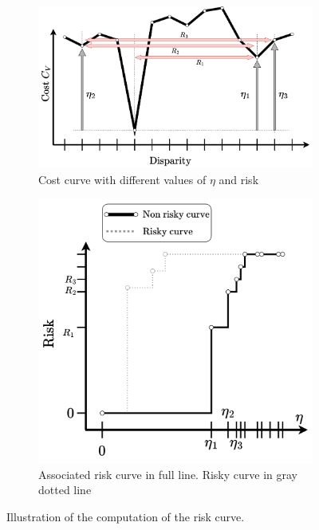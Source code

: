 \begin{figure}
    \centering
    \begin{subfigure}[t]{0.6\linewidth}
        \centering
        \includegraphics[width=\linewidth]{Images/Chap_1/Integral_Risk_1.png}
        \caption{Cost curve with different values of $\eta$ and risk}
        \label{fig:integral_risk_1}
    \end{subfigure}\hfill
    \begin{subfigure}[t]{0.4\linewidth}
        \centering
        \includegraphics[width=\linewidth]{Images/Chap_1/Integral_Risk_2.png}
        \caption{Associated risk curve in full line. Risky curve in gray dotted line}
        \label{fig:integral_risk_2}
    \end{subfigure}\hfill
    \caption{Illustration of the computation of the risk curve.}
    \label{fig:integral_risk}
\end{figure}

\pagebreak
\blankpage
